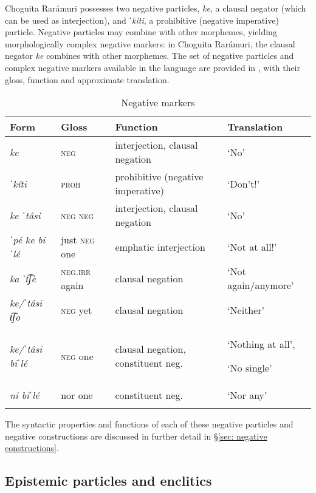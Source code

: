 Choguita Rarámuri possesses two negative particles, \textit{ke}, a clausal negator (which can be used as interjection), and \textit{ˈkíti}, a prohibitive (negative imperative) particle. Negative particles may combine with other morphemes, yielding morphologically complex negative markers: in Choguita Rarámuri, the clausal negator \textit{ke} combines with other morphemes. The set of negative particles and complex negative markers available in the language are provided in , with their gloss, function and approximate translation.


\begin{table}
\caption{Negative markers}
\label{tab:negative-constructions}

\begin{tabularx}{\textwidth}{llQQ}
\lsptoprule
\textbf{Form} & \textbf{Gloss} & \textbf{Function} & \textbf{Translation}\\
\midrule
\textit{ke} & \textsc{neg} & interjection, clausal negation & ‘No’\\
\textit{ˈkíti} & \textsc{proh} & prohibitive (negative imperative) & `Don't!'\\
\textit{ke ˈtâsi} & \textsc{neg neg} & interjection, clausal negation & `No’\\
\textit{ˈpé ke biˈlé} & just \textsc{neg} one & emphatic interjection & `Not at all!'\\
\textit{ka ˈt͡ʃè} & \textsc{neg.irr} again & clausal negation & `Not again/anymore’\\
\textit{ke/ˈtâsi t͡ʃo} & \textsc{neg} yet & clausal negation & ‘Neither’\\
\textit{ke/ˈtâsi biˈlé} & \textsc{neg} one & clausal negation, constituent neg. & ‘Nothing at all’,

‘No single’\\
\textit{ni biˈlé} & nor one & constituent neg. & ‘Nor any’\\
\lspbottomrule
\end{tabularx}
\end{table}
\hspace{3cm}

The syntactic properties and functions of each of these negative particles and negative constructions are discussed in further detail in §\ref{sec: negative constructions}.

\subsection{Epistemic particles and enclitics}
\label{subsec: epistemic particles}

